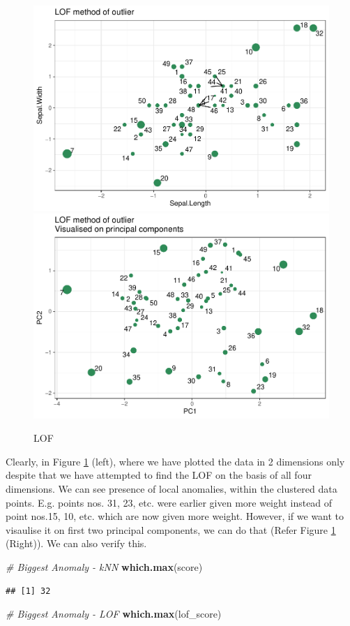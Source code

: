 \documentclass[
]{book}
\newenvironment{Shaded}{\begin{snugshade}}{\end{snugshade}}
\newcommand{\CommentTok}[1]{\textcolor[rgb]{0.56,0.35,0.01}{\textit{#1}}}
\newcommand{\FunctionTok}[1]{\textcolor[rgb]{0.13,0.29,0.53}{\textbf{#1}}}
\newcommand{\NormalTok}[1]{#1}
\begin{document}
\begin{figure}

{\centering \includegraphics[width=0.48\linewidth]{DauR_files/figure-latex/an10-1} \includegraphics[width=0.48\linewidth]{DauR_files/figure-latex/an10-2} 

}

\caption{LOF}\label{fig:an10}
\end{figure}

Clearly, in Figure \ref{fig:an10} (left), where we have plotted the data in 2 dimensions only despite that we have attempted to find the LOF on the basis of all four dimensions. We can see presence of local anomalies, within the clustered data points. E.g. points nos. 31, 23, etc. were earlier given more weight instead of point nos.15, 10, etc. which are now given more weight. However, if we want to visaulise it on first two principal components, we can do that (Refer Figure \ref{fig:an10} (Right)). We can also verify this.

\begin{Shaded}
\begin{Highlighting}[]
\CommentTok{\# Biggest Anomaly {-} kNN}
\FunctionTok{which.max}\NormalTok{(score)}
\end{Highlighting}
\end{Shaded}

\begin{verbatim}
## [1] 32
\end{verbatim}

\begin{Shaded}
\begin{Highlighting}[]
\CommentTok{\# Biggest Anomaly {-} LOF}
\FunctionTok{which.max}\NormalTok{(lof\_score)}
\end{Highlighting}
\end{Shaded}
\end{document}
